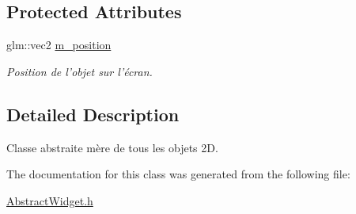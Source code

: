 \subsection*{Protected Attributes}
\begin{DoxyCompactItemize}
\item 
\hypertarget{classAbstractWidget_a847822efcb2b75b9696e1fc9b4ecfa88}{glm\+::vec2 \hyperlink{classAbstractWidget_a847822efcb2b75b9696e1fc9b4ecfa88}{m\+\_\+position}}\label{classAbstractWidget_a847822efcb2b75b9696e1fc9b4ecfa88}

\begin{DoxyCompactList}\small\item\em Position de l'objet sur l'écran. \end{DoxyCompactList}\end{DoxyCompactItemize}


\subsection{Detailed Description}
Classe abstraite mère de tous les objets 2\+D. 

The documentation for this class was generated from the following file\+:\begin{DoxyCompactItemize}
\item 
\hyperlink{AbstractWidget_8h}{Abstract\+Widget.\+h}\end{DoxyCompactItemize}
